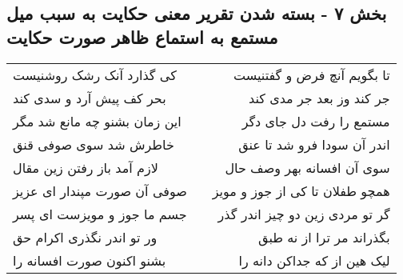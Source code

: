 \begin{center}
\section*{بخش ۷ - بسته شدن تقریر معنی حکایت به سبب میل مستمع به استماع ظاهر صورت حکایت}
\label{sec:sh007}
\begin{longtable}{l p{0.5cm} r}
کی گذارد آنک رشک روشنیست
&&
تا بگویم آنچ فرض و گفتنیست
\\
بحر کف پیش آرد و سدی کند
&&
جر کند وز بعد جر مدی کند
\\
این زمان بشنو چه مانع شد مگر
&&
مستمع را رفت دل جای دگر
\\
خاطرش شد سوی صوفی قنق
&&
اندر آن سودا فرو شد تا عنق
\\
لازم آمد باز رفتن زین مقال
&&
سوی آن افسانه بهر وصف حال
\\
صوفی آن صورت مپندار ای عزیز
&&
همچو طفلان تا کی از جوز و مویز
\\
جسم ما جوز و مویزست ای پسر
&&
گر تو مردی زین دو چیز اندر گذر
\\
ور تو اندر نگذری اکرام حق
&&
بگذراند مر ترا از نه طبق
\\
بشنو اکنون صورت افسانه را
&&
لیک هین از که جداکن دانه را
\\
\end{longtable}
\end{center}
